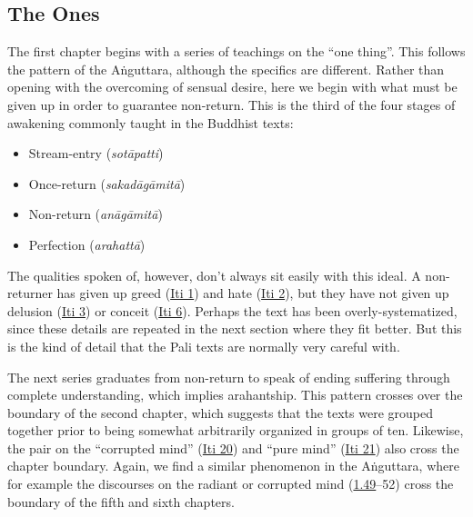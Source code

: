 \documentclass[12pt,openany]{book}%
\begin{document}
\subsection*{The Ones}

The first chapter begins with a series of teachings on the “one thing”. This follows the pattern of the \textsanskrit{Aṅguttara}, although the specifics are different. Rather than opening with the overcoming of sensual desire, here we begin with what must be given up in order to guarantee non-return. This is the third of the four stages of awakening commonly taught in the Buddhist texts:

\begin{itemize}%
\item Stream-entry (\emph{\textsanskrit{sotāpatti}})%
\item Once-return (\emph{\textsanskrit{sakadāgāmitā}})%
\item Non-return (\emph{\textsanskrit{anāgāmitā}})%
\item Perfection (\emph{\textsanskrit{arahattā}})%
\end{itemize}

The qualities spoken of, however, don’t always sit easily with this ideal. A non-returner has given up greed (\href{https://suttacentral.net/iti1/en/sujato}{Iti 1}) and hate (\href{https://suttacentral.net/iti2/en/sujato}{Iti 2}), but they have not given up delusion (\href{https://suttacentral.net/iti3/en/sujato}{Iti 3}) or conceit (\href{https://suttacentral.net/iti6/en/sujato}{Iti 6}). Perhaps the text has been overly-systematized, since these details are repeated in the next section where they fit better. But this is the kind of detail that the Pali texts are normally very careful with.

The next series graduates from non-return to speak of ending suffering through complete understanding, which implies arahantship. This pattern crosses over the boundary of the second chapter, which suggests that the texts were grouped together prior to being somewhat arbitrarily organized in groups of ten. Likewise, the pair on the “corrupted mind” (\href{https://suttacentral.net/iti20/en/sujato}{Iti 20}) and “pure mind” (\href{https://suttacentral.net/iti21/en/sujato}{Iti 21}) also cross the chapter boundary. Again, we find a similar phenomenon in the \textsanskrit{Aṅguttara}, where for example the discourses on the radiant or corrupted mind (\href{https://suttacentral.net/1.49/en/sujato}{1.49}–52) cross the boundary of the fifth and sixth chapters.
\end{document}
